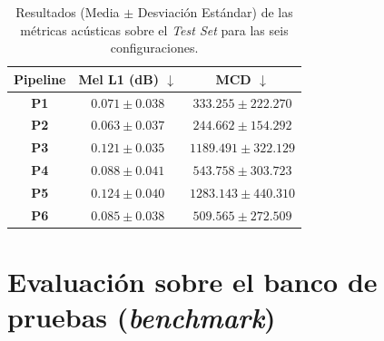 \begin{table}[H]
    \centering
    \renewcommand{\arraystretch}{1.3} %
    \begin{tabular}{|c||c|c|}
    \hline
    \textbf{Pipeline} & \textbf{Mel L1 (dB) $\downarrow$} & \textbf{MCD $\downarrow$} \\ \hline\hline
    \textbf{P1} & $0.071 \pm \text{0.038}$ & $333.255 \pm \text{222.270}$ \\ \hline
    \textbf{P2} & $0.063 \pm 0.037$ & $244.662 \pm 154.292$ \\ \hline
    \textbf{P3} & $0.121 \pm \text{0.035}$ & $1189.491 \pm \text{322.129}$ \\ \hline
    \textbf{P4} & $0.088 \pm \text{0.041}$ & $543.758 \pm \text{303.723}$ \\ \hline
    \textbf{P5} & $0.124 \pm \text{0.040}$ & $1283.143 \pm \text{440.310}$ \\ \hline
    \textbf{P6} & $0.085 \pm \text{0.038}$ & $509.565 \pm \text{272.509}$ \\ \hline
    \end{tabular}
    \caption{Resultados (Media $\pm$ Desviación Estándar) de las métricas acústicas sobre el \textit{Test Set} para las seis configuraciones.}
    \label{tab:metricas_exactas_test}
\end{table}





\section{Evaluación sobre el banco de pruebas (\textit{benchmark})}

